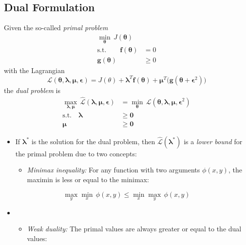 \documentclass[a4paper, 11pt, accentcolor = tud3b]{tudreport}
\renewcommand{\vec}[1]{\mathbf{#1}}
\begin{document}
			\subsection{Dual Formulation}
				Given the so-called \emph{primal problem}
				\begin{align}
					\min\limits_{\vec{\theta}} \, J(\vec{\theta}) & \\
					\textrm{s.t.} \qquad
					\vec{f}(\vec{\theta}) & = 0 \\
					\vec{g}(\vec{\theta}) &\geq 0
				\end{align}
				with the Lagrangian
				\begin{equation}
					\mathcal{L}(\vec{\theta}, \vec{\lambda}, \vec{\mu}, \vec{\epsilon}) = J(\theta) + \vec{\lambda}^T\vec{f}(\vec{\theta}) + \vec{\mu}^T \big(\vec{g}(\vec{\theta} + \vec{\epsilon}^2)\big)
				\end{equation}
				the \emph{dual problem} is
				\begin{align}
					\max\limits_{\vec{\lambda}, \vec{\mu}} \, \hat{\mathcal{L}}(\vec{\lambda}, \vec{\mu}, \vec{\epsilon}) &= \min\limits_{\vec{\theta}} \, \mathcal{L}(\vec{\theta}, \vec{\lambda}, \vec{\mu}, \vec{\epsilon}^2) \\
					\textrm{s.t.} \quad
					\vec{\lambda} &\geq \vec{0} \\
					\vec{\mu} &\geq \vec{0}
				\end{align}
				\begin{itemize}
					\item If \( \vec{\lambda}^\ast \) is the solution for the dual problem, then \( \hat{\mathcal{L}}(\vec{\lambda}^\ast) \) is a \emph{lower bound} for the primal problem due to two concepts:
						\begin{itemize}
							\item \emph{Minimax inequality:} For any function with two arguments \( \phi(x, y) \), the maximin is less or equal to the minimax:
						\end{itemize}
				\end{itemize}
				\begin{equation}
					\max_y \min_x \, \phi(x, y) \leq \min_x \max_y \, \phi(x, y)
				\end{equation}
				\begin{itemize}
					\item[]
						\begin{itemize}
							\item \emph{Weak duality:} The primal values are always greater or equal to the dual values:
						\end{itemize}
				\end{itemize}
\end{document}
